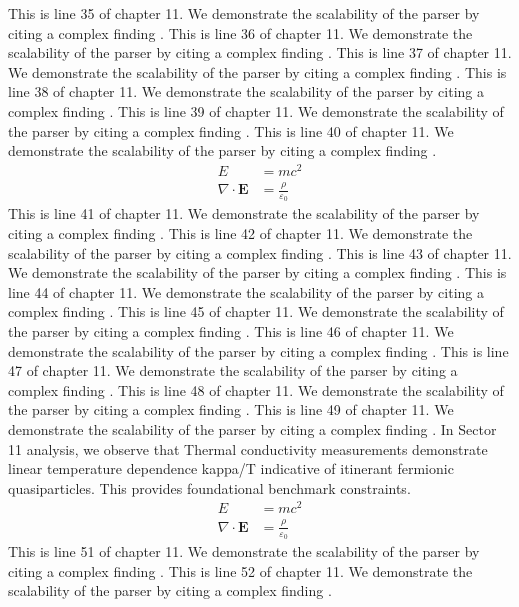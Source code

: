 This is line 35 of chapter 11. We demonstrate the scalability of the parser by citing a complex finding \cite{ref11_35}.
This is line 36 of chapter 11. We demonstrate the scalability of the parser by citing a complex finding \cite{ref11_36}.
This is line 37 of chapter 11. We demonstrate the scalability of the parser by citing a complex finding \cite{ref11_37}.
This is line 38 of chapter 11. We demonstrate the scalability of the parser by citing a complex finding \cite{ref11_38}.
This is line 39 of chapter 11. We demonstrate the scalability of the parser by citing a complex finding \cite{ref11_39}.
This is line 40 of chapter 11. We demonstrate the scalability of the parser by citing a complex finding \cite{ref11_40}.
\begin{align*}
  E &= mc^2 \\
  \nabla \cdot \mathbf{E} &= \frac{\rho}{\varepsilon_0}
\end{align*}
This is line 41 of chapter 11. We demonstrate the scalability of the parser by citing a complex finding \cite{ref11_41}.
This is line 42 of chapter 11. We demonstrate the scalability of the parser by citing a complex finding \cite{ref11_42}.
This is line 43 of chapter 11. We demonstrate the scalability of the parser by citing a complex finding \cite{ref11_43}.
This is line 44 of chapter 11. We demonstrate the scalability of the parser by citing a complex finding \cite{ref11_44}.
This is line 45 of chapter 11. We demonstrate the scalability of the parser by citing a complex finding \cite{ref11_45}.
This is line 46 of chapter 11. We demonstrate the scalability of the parser by citing a complex finding \cite{ref11_46}.
This is line 47 of chapter 11. We demonstrate the scalability of the parser by citing a complex finding \cite{ref11_47}.
This is line 48 of chapter 11. We demonstrate the scalability of the parser by citing a complex finding \cite{ref11_48}.
This is line 49 of chapter 11. We demonstrate the scalability of the parser by citing a complex finding \cite{ref11_49}.
In Sector 11 analysis, we observe that Thermal conductivity measurements demonstrate linear temperature dependence kappa/T indicative of itinerant fermionic quasiparticles. This provides foundational benchmark constraints.
\begin{align*}
  E &= mc^2 \\
  \nabla \cdot \mathbf{E} &= \frac{\rho}{\varepsilon_0}
\end{align*}
This is line 51 of chapter 11. We demonstrate the scalability of the parser by citing a complex finding \cite{ref11_51}.
This is line 52 of chapter 11. We demonstrate the scalability of the parser by citing a complex finding \cite{ref11_52}.
